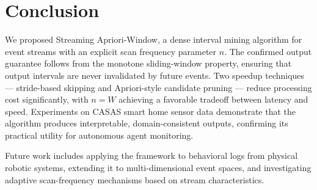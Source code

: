 \section{Conclusion}

We proposed Streaming Apriori-Window, a dense interval mining algorithm
for event streams with an explicit scan frequency parameter $n$.
The confirmed output guarantee follows from the monotone sliding-window
property, ensuring that output intervals are never invalidated by
future events.
Two speedup techniques --- stride-based skipping and Apriori-style
candidate pruning --- reduce processing cost significantly,
with $n = W$ achieving a favorable tradeoff between latency and speed.
Experiments on CASAS smart home sensor data demonstrate that the
algorithm produces interpretable, domain-consistent outputs,
confirming its practical utility for autonomous agent monitoring.

Future work includes applying the framework to behavioral logs from
physical robotic systems, extending it to multi-dimensional event spaces,
and investigating adaptive scan-frequency mechanisms based on
stream characteristics.
